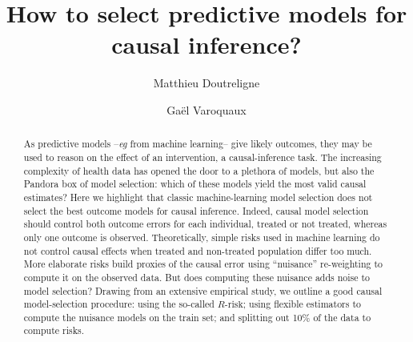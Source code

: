 \documentclass[10pt]{article}
\title{How to select predictive models for causal inference?}
\author[1,2,*]{Matthieu Doutreligne}
\author[1]{Gaël Varoquaux}
\affil[1]{Inria, Soda, Saclay, France}
\affil[2]{Mission Data, Haute Autorité de Santé, Saint-Denis, France}
\affil[*]{Corresponding author: matthieu.doutreligne@inria.fr}
\begin{document}


\maketitle

\begin{abstract}
    As predictive models --\emph{eg} from machine learning-- give likely
    outcomes, they may be used to reason on the effect of an intervention,
    a causal-inference task. The increasing complexity of
    health data has opened the door to a plethora of models, but also the
    Pandora box of model selection: which of these models yield the most
    valid causal estimates?
    Here we highlight that classic machine-learning model selection
    does not select the best outcome models for causal inference.
    Indeed, causal model selection should control both outcome errors
    for each individual, treated or not
    treated, whereas only one outcome is observed.
    Theoretically, simple risks used in machine learning do not control
    causal effects when treated and non-treated population differ too much.
    More elaborate risks build proxies of the causal error using
    ``nuisance'' re-weighting to compute it on the observed data. But
    does computing these nuisance adds noise to model selection? Drawing
    from an extensive empirical study, we outline a good causal
    model-selection procedure: using the so-called
    $R\text{-risk}$; using flexible estimators to
    compute the nuisance models on the train set; and splitting out 10\% of
    the data to compute risks.
\end{abstract}
\clearpage
\end{document}
